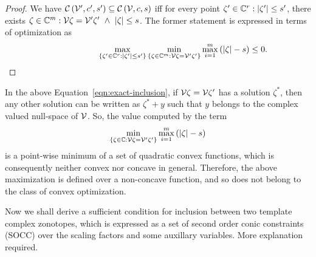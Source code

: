 %
\begin{proof}
We have
$\mathit{\mathcal{C}}\left(\mathcal{V}^\prime,c^\prime,s^\prime\right)\subseteq\mathit{\mathcal{C}}\left(\mathcal{V},c,s\right)$
iff for every point $\zeta^\prime\in\mathbb{C}^r:\left|\zeta^\prime\right|\leq s^\prime$,
there exists
$\zeta\in\mathbb{C}^m:\mathcal{V}\zeta=\mathcal{V}^\prime\zeta^\prime~\wedge~\left|\zeta\right|\leq
s$.  The former statement is expressed in terms of optimization
as \vspace{-2.2em}\[\hspace{6em}\max_{\left\{\zeta^\prime\in\mathbb{C}^{r}:\left|\zeta^\prime\right|\leq s^\prime\right\}}\min_{\left\{\zeta\in\mathbb{C}^m:\mathcal{V}\zeta=\mathcal{V}^\prime\zeta^\prime\right\}}\max_{i=1}^m\left(\left|\zeta\right|-s\right)\leq
0. \]
\end{proof}
%
In the above Equation~\ref{eqn:exact-inclusion}, if
$\mathcal{V}\zeta=\mathcal{V}\zeta^\prime$ has a solution $\zeta^*$, then any other
solution can be written as $\zeta^*+y$ such that $y$ belongs to the
complex valued null-space of $\mathcal{V}$.  So, the value computed by the
term \[\min_{\left\{\zeta\in\mathbb{C}:\mathcal{V}\zeta=\mathcal{V}^\prime\zeta^\prime\right\}}\max_{i=1}^m\left(\left|\zeta\right|-s\right)\]
is a point-wise minimum of a set of quadratic convex functions, which
is consequently neither convex nor concave in general.  Therefore, the
above maximization is defined over a non-concave function, and so does
not belong to the class of convex optimization.

Now we shall derive a sufficient condition for inclusion between two
template complex zonotopes, which is expressed as a set of second
order conic constraints (SOCC) over the scaling factors and some
auxillary variables.  {\color{blue} More explanation required.}

